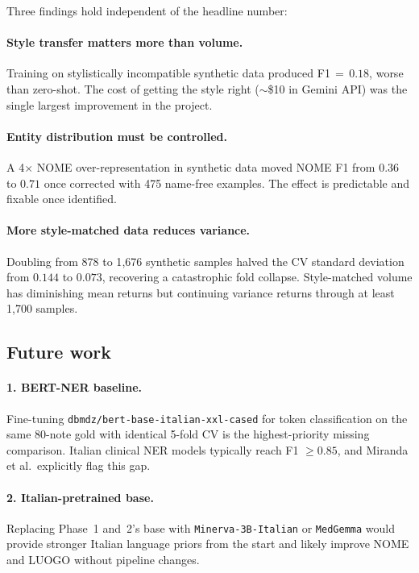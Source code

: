 \documentclass[11pt,a4paper]{article}
\begin{document}
Three findings hold independent of the headline number:

\paragraph{Style transfer matters more than volume.} Training on stylistically incompatible synthetic data produced F1$\,=\,0.18$, worse than zero-shot. The cost of getting the style right ($\sim$\$10 in Gemini API) was the single largest improvement in the project.

\paragraph{Entity distribution must be controlled.} A 4$\times$ NOME over-representation in synthetic data moved NOME F1 from $0.36$ to $0.71$ once corrected with 475 name-free examples. The effect is predictable and fixable once identified.

\paragraph{More style-matched data reduces variance.} Doubling from 878 to 1{,}676 synthetic samples halved the CV standard deviation from $0.144$ to $0.073$, recovering a catastrophic fold collapse. Style-matched volume has diminishing mean returns but continuing variance returns through at least 1{,}700 samples.

\subsection{Future work}

\paragraph{1. BERT-NER baseline.} Fine-tuning \texttt{dbmdz/bert-base-italian-xxl-cased} for token classification on the same 80-note gold with identical 5-fold CV is the highest-priority missing comparison. Italian clinical NER models typically reach F1 $\geq 0.85$, and Miranda et al.\ explicitly flag this gap.

\paragraph{2. Italian-pretrained base.} Replacing Phase~1 and~2's base with \texttt{Minerva-3B-Italian} or \texttt{MedGemma} would provide stronger Italian language priors from the start and likely improve NOME and LUOGO without pipeline changes.
\end{document}
